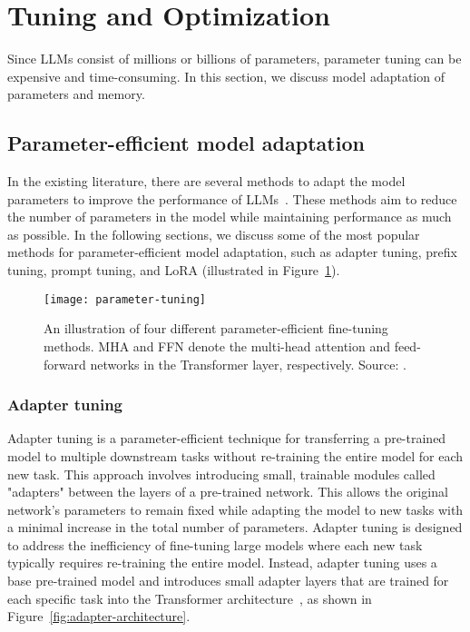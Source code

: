 \section{Tuning and Optimization}
\label{sec:tuning-optimization}

Since LLMs consist of millions or billions of parameters, parameter tuning can be expensive and time-consuming.
In this section, we discuss model adaptation of parameters and memory.

\subsection{Parameter-efficient model adaptation}
\label{subsec:parameter-efficient}

In the existing literature, there are several methods to adapt the model parameters to improve the performance of LLMs~\cite{hu2021lora, li2021prefixtuning, lester2021power}.
These methods aim to reduce the number of parameters in the model while maintaining performance as much as possible.
In the following sections, we discuss some of the most popular methods for parameter-efficient model adaptation, such as adapter tuning, prefix tuning, prompt tuning, and LoRA (illustrated in Figure~\ref{fig:parameter-tuning}).

\begin{figure}[h]
	\centering
	\texttt{[image: parameter-tuning]}
	\caption{An illustration of four different parameter-efficient fine-tuning methods. MHA and FFN denote the multi-head
		attention and feed-forward networks in the Transformer layer, respectively. Source: \textcite{survey}.}
	\label{fig:parameter-tuning}
\end{figure}

\subsubsection{Adapter tuning}
\label{subsubsec:adapter-tuning}

Adapter tuning is a parameter-efficient technique for transferring a pre-trained model to multiple downstream tasks without re-training the entire model for each new task.
This approach involves introducing small, trainable modules called "adapters" between the layers of a pre-trained network. This allows the original network's parameters to remain fixed while adapting the model to new tasks with a minimal increase in the total number of parameters.
Adapter tuning is designed to address the inefficiency of fine-tuning large models where each new task typically requires re-training the entire model.
Instead, adapter tuning uses a base pre-trained model and introduces small adapter layers that are trained for each specific task into the Transformer architecture~\cite{houlsby2019parameterefficient, hu2023llmadapters}, as shown in Figure~\ref{fig:adapter-architecture}.

